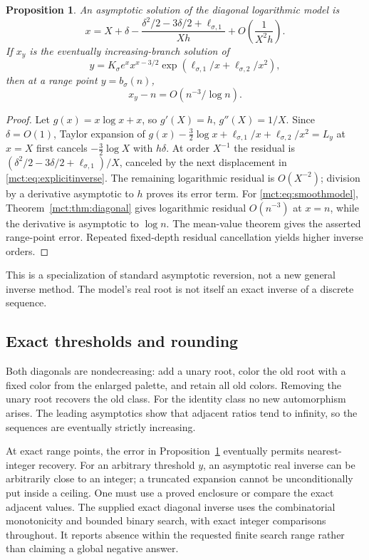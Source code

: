 \documentclass[11pt]{article}
\newtheorem{proposition}[theorem]{Proposition}
\theoremstyle{definition}
\begin{document}
\begin{proposition}\label{mct:prop:inverse}
An asymptotic solution of the diagonal logarithmic model is
\begin{equation}\label{mct:eq:explicitinverse}
 x=X+\delta-
 \frac{\delta^2/2-3\delta/2+\ell_{\sigma,1}}{Xh}
 +O\left(\frac1{X^2h}\right).
\end{equation}
If $x_y$ is the eventually increasing-branch solution of
\begin{equation}\label{mct:eq:smoothmodel}
 y=K_\sigma e^x x^{x-3/2}
       \exp(\ell_{\sigma,1}/x+\ell_{\sigma,2}/x^2),
\end{equation}
then at a range point $y=b_\sigma(n)$,
\[
 x_y-n=O(n^{-3}/\log n).
\]
\end{proposition}
\begin{proof}
Let $g(x)=x\log x+x$, so $g'(X)=h$, $g''(X)=1/X$. Since $\delta=O(1)$, Taylor expansion of
$g(x)-\tfrac32\log x+\ell_{\sigma,1}/x+\ell_{\sigma,2}/x^2=L_y$
at $x=X$ first cancels $-\frac32\log X$ with $h\delta$. At order $X^{-1}$ the residual is
$(\delta^2/2-3\delta/2+\ell_{\sigma,1})/X$, canceled by the next displacement in \eqref{mct:eq:explicitinverse}. The remaining logarithmic residual is $O(X^{-2})$; division by a derivative asymptotic to $h$ proves its error term. For \eqref{mct:eq:smoothmodel}, Theorem~\ref{mct:thm:diagonal} gives logarithmic residual $O(n^{-3})$ at $x=n$, while the derivative is asymptotic to $\log n$. The mean-value theorem gives the asserted range-point error. Repeated fixed-depth residual cancellation yields higher inverse orders.
\end{proof}
This is a specialization of standard asymptotic reversion, not a new general inverse method. The model's real root is not itself an exact inverse of a discrete sequence.

\subsection{Exact thresholds and rounding}
Both diagonals are nondecreasing: add a unary root, color the old root with a fixed color from the enlarged palette, and retain all old colors. Removing the unary root recovers the old class. For the identity class no new automorphism arises. The leading asymptotics show that adjacent ratios tend to infinity, so the sequences are eventually strictly increasing.

At exact range points, the error in Proposition~\ref{mct:prop:inverse} eventually permits nearest-integer recovery. For an arbitrary threshold $y$, an asymptotic real inverse can be arbitrarily close to an integer; a truncated expansion cannot be unconditionally put inside a ceiling. One must use a proved enclosure or compare the exact adjacent values. The supplied exact diagonal inverse uses the combinatorial monotonicity and bounded binary search, with exact integer comparisons throughout. It reports absence within the requested finite search range rather than claiming a global negative answer.
\end{document}
